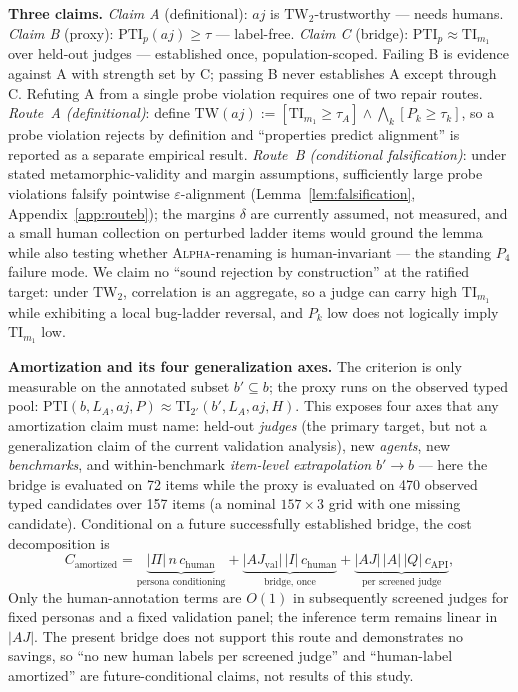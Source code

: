 \documentclass{article}
\newcommand{\TW}{\mathrm{TW}}                    %
\newcommand{\TI}{\mathrm{TI}}                    %
\newcommand{\PTI}{\mathrm{PTI}}                  %
\newcommand{\TIm}[1]{\TI_{m_{#1}}}
\begin{document}
\textbf{Three claims.}
\emph{Claim A} (definitional): $aj$ is $\TW_2$-trustworthy --- needs humans.
\emph{Claim B} (proxy): $\PTI_p(aj) \ge \tau$ --- label-free.
\emph{Claim C} (bridge): $\PTI_p \approx \TIm{1}$ over held-out judges --- established once, population-scoped.
Failing B is evidence against A with strength set by C; passing B never establishes A except through C.
Refuting A from a single probe violation requires one of two repair routes.
\emph{Route~A (definitional)}: define $\TW(aj) := [\TIm{1} \ge \tau_A] \wedge \bigwedge_k [P_k \ge \tau_k]$, so a probe violation rejects by definition and ``properties predict alignment'' is reported as a separate empirical result.
\emph{Route~B (conditional falsification)}: under stated metamorphic-validity and margin assumptions, sufficiently large probe violations falsify pointwise $\varepsilon$-alignment (Lemma~\ref{lem:falsification}, Appendix~\ref{app:routeb}); the margins $\delta$ are currently assumed, not measured, and a small human collection on perturbed ladder items would ground the lemma while also testing whether \textsc{Alpha}-renaming is human-invariant --- the standing $P_4$ failure mode.
We claim no ``sound rejection by construction'' at the ratified target: under $\TW_2$, correlation is an aggregate, so a judge can carry high $\TIm{1}$ while exhibiting a local bug-ladder reversal, and $P_k$ low does not logically imply $\TIm{1}$ low.

\textbf{Amortization and its four generalization axes.}
The criterion is only measurable on the annotated subset $b' \subseteq b$; the proxy runs on the observed typed pool:
$\PTI(b, L_A, aj, P) \approx \TI_{2'}(b', L_A, aj, H)$.
This exposes four axes that any amortization claim must name: held-out \emph{judges} (the primary target, but not a generalization claim of the current validation analysis), new \emph{agents}, new \emph{benchmarks}, and within-benchmark \emph{item-level extrapolation} $b' \to b$ --- here the bridge is evaluated on 72 items while the proxy is evaluated on 470 observed typed candidates over 157 items (a nominal $157 \times 3$ grid with one missing candidate).
Conditional on a future successfully established bridge, the cost decomposition is
\begin{equation}
C_{\mathrm{amortized}} = \underbrace{\lvert\Pi\rvert\, n\, c_{\mathrm{human}}}_{\text{persona conditioning}}
+ \underbrace{\lvert AJ_{\mathrm{val}}\rvert\, \lvert I\rvert\, c_{\mathrm{human}}}_{\text{bridge, once}}
+ \underbrace{\lvert AJ\rvert\, \lvert A\rvert\, \lvert Q\rvert\, c_{\mathrm{API}}}_{\text{per screened judge}},
\label{eq:cost}
\end{equation}
Only the human-annotation terms are $O(1)$ in subsequently screened judges for fixed personas and a fixed validation panel; the inference term remains linear in $\lvert AJ\rvert$. The present bridge does not support this route and demonstrates no savings, so ``no new human labels per screened judge'' and ``human-label amortized'' are future-conditional claims, not results of this study.
\end{document}
